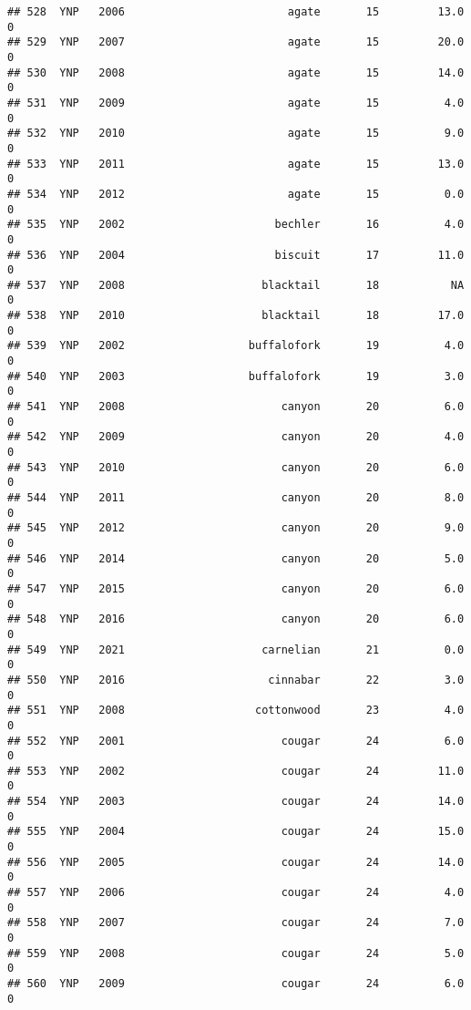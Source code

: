 \documentclass[
]{article}
\begin{document}
\begin{verbatim}
## 528  YNP   2006                         agate       15         13.0       0
## 529  YNP   2007                         agate       15         20.0       0
## 530  YNP   2008                         agate       15         14.0       0
## 531  YNP   2009                         agate       15          4.0       0
## 532  YNP   2010                         agate       15          9.0       0
## 533  YNP   2011                         agate       15         13.0       0
## 534  YNP   2012                         agate       15          0.0       0
## 535  YNP   2002                       bechler       16          4.0       0
## 536  YNP   2004                       biscuit       17         11.0       0
## 537  YNP   2008                     blacktail       18           NA       0
## 538  YNP   2010                     blacktail       18         17.0       0
## 539  YNP   2002                   buffalofork       19          4.0       0
## 540  YNP   2003                   buffalofork       19          3.0       0
## 541  YNP   2008                        canyon       20          6.0       0
## 542  YNP   2009                        canyon       20          4.0       0
## 543  YNP   2010                        canyon       20          6.0       0
## 544  YNP   2011                        canyon       20          8.0       0
## 545  YNP   2012                        canyon       20          9.0       0
## 546  YNP   2014                        canyon       20          5.0       0
## 547  YNP   2015                        canyon       20          6.0       0
## 548  YNP   2016                        canyon       20          6.0       0
## 549  YNP   2021                     carnelian       21          0.0       0
## 550  YNP   2016                      cinnabar       22          3.0       0
## 551  YNP   2008                    cottonwood       23          4.0       0
## 552  YNP   2001                        cougar       24          6.0       0
## 553  YNP   2002                        cougar       24         11.0       0
## 554  YNP   2003                        cougar       24         14.0       0
## 555  YNP   2004                        cougar       24         15.0       0
## 556  YNP   2005                        cougar       24         14.0       0
## 557  YNP   2006                        cougar       24          4.0       0
## 558  YNP   2007                        cougar       24          7.0       0
## 559  YNP   2008                        cougar       24          5.0       0
## 560  YNP   2009                        cougar       24          6.0       0

\end{verbatim}
\end{document}
